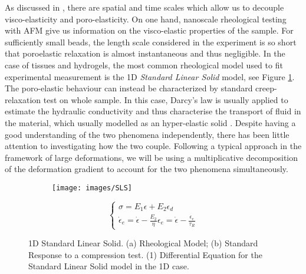As discussed in \cite{viscoporo}, there are spatial and time scales which allow us to decouple visco-elasticity and poro-elasticity. On one hand, nanoscale rheological testing with AFM give us information on the visco-elastic properties of the sample. For sufficiently small beads, the length scale considered in the experiment is so short that poroelastic relaxation is almost instantaneous and thus negligible. In the case of tissues and hydrogels, the most common rheological model used to fit experimental measurement is the 1D \textit{Standard Linear Solid} model\cite{Article1,viscoporo}, see Figure \ref{SLS}. The poro-elastic behaviour can instead be characterized by standard creep-relaxation test on whole sample. In this case, Darcy's law is usually applied to estimate the hydraulic conductivity and thus characterise the transport of fluid in the material, which usually modelled as an hyper-elastic solid \cite{Netti,viscoporo}. Despite having a good understanding of the two phenomena independently, there has been little attention to investigating how the two couple. Following a typical approach in the framework of large deformations, we will be using a multiplicative decomposition of the deformation gradient to account for the two phenomena simultaneously. 

\begin{figure}
	\begin{subfigure}{0.45\textwidth}
		\centering 
		\def\svgwidth{1.3\linewidth}
		
		\caption{}
	\end{subfigure}
	\begin{subfigure}{0.45\textwidth}
	\centering
	\texttt{[image: images/SLS]}\qquad 
	\caption{}
	\end{subfigure}

\vspace{5mm}
\begin{equation}
\begin{cases}
\sigma = E_1\epsilon+E_2\epsilon_d\\
\dot{\epsilon}_e = \dot{\epsilon} -\frac{E_2}{\eta} \epsilon_e = \dot{\epsilon} - \frac{\epsilon_e}{\tau_R}
\end{cases}
\end{equation}
\vspace{3mm}
\caption{1D Standard Linear Solid. (a) Rheological Model; (b) Standard Response to a compression test. (1) Differential Equation for the Standard Linear Solid model in the 1D case.}
\label{SLS}
\end{figure}

